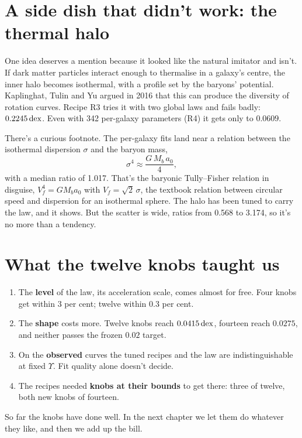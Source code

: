 


\section{A side dish that didn't work: the thermal halo}

One idea deserves a mention because it looked like the natural imitator and isn't. If dark matter particles interact enough to thermalise in a galaxy's centre, the inner halo becomes isothermal, with a profile set by the baryons' potential. Kaplinghat, Tulin and Yu argued in 2016 that this can produce the diversity of rotation curves. Recipe R3 tries it with two global laws and fails badly: $0.2245\,\mathrm{dex}$. Even with 342 per-galaxy parameters (R4) it gets only to $0.0609$.

There's a curious footnote. The per-galaxy fits land near a relation between the isothermal dispersion $\sigma$ and the baryon mass,
\begin{equation}
\sigma^4\approx\frac{G\,M_b\,a_0}{4},
\end{equation}
with a median ratio of 1.017. That's the baryonic Tully--Fisher relation in disguise, $V_f^4=GM_ba_0$ with $V_f=\sqrt2\,\sigma$, the textbook relation between circular speed and dispersion for an isothermal sphere. The halo has been tuned to carry the law, and it shows. But the scatter is wide, ratios from 0.568 to 3.174, so it's no more than a tendency.

\section{What the twelve knobs taught us}

\begin{enumerate}
\item The \textbf{level} of the law, its acceleration scale, comes almost for free. Four knobs get within 3 per cent; twelve within 0.3 per cent.
\item The \textbf{shape} costs more. Twelve knobs reach $0.0415\,\mathrm{dex}$, fourteen reach $0.0275$, and neither passes the frozen $0.02$ target.
\item On the \textbf{observed} curves the tuned recipes and the law are indistinguishable at fixed $\Upsilon$. Fit quality alone doesn't decide.
\item The recipes needed \textbf{knobs at their bounds} to get there: three of twelve, both new knobs of fourteen.
\end{enumerate}

So far the knobs have done well. In the next chapter we let them do whatever they like, and then we add up the bill.
